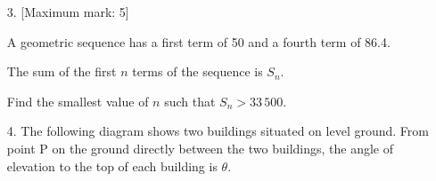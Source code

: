 \documentclass[12pt, twoside]{article}
\begin{document}
\begin{enumerate}[itemsep=0.15cm]
\begin{enumerate}[itemsep=0.1cm]
  \item[(a)] Find the amount that Sam will have in his account after 10 years. \hfill [3]
\end{enumerate}

David also invests \$1700 in a savings account that pays an annual rate of
interest of $r$\%, compounded yearly. David makes no further payments or
withdrawals from this account.

\begin{enumerate}[itemsep=0.1cm]
  \item[(b)] Find the value of $r$ required so that the amount in David's account after
  10 years will be equal to the amount in Sam's account. \hfill [2]
  \item[(c)] Find the interest David will earn over the 10 years. \hfill [1]
\end{enumerate}


\newpage

\item[3.] [Maximum mark: 5]

A geometric sequence has a first term of 50 and a fourth term of 86.4.

The sum of the first $n$ terms of the sequence is $S_n$.

Find the smallest value of $n$ such that $S_n > 33\,500$.


\newpage

\item[4.] The following diagram shows two buildings situated on level ground.
From point P on the ground directly between the two buildings, the angle
of elevation to the top of each building is $\theta$.


\end{enumerate}
\end{document}
